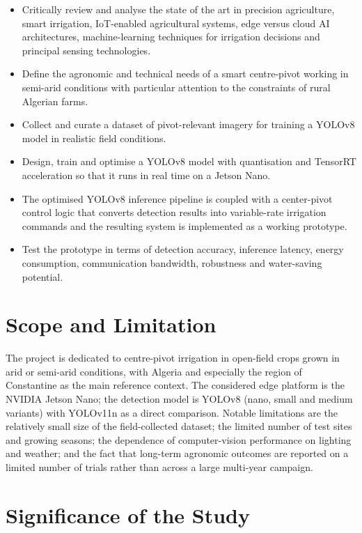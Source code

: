 \documentclass[12pt,a4paper]{report}
\begin{document}
\begin{itemize}
    \item Critically review and analyse the state of the art in precision agriculture, smart irrigation, IoT-enabled agricultural systems, edge versus cloud AI architectures, machine-learning techniques for irrigation decisions and principal sensing technologies.
    \item Define the agronomic and technical needs of a smart centre-pivot working in semi-arid conditions with particular attention to the constraints of rural Algerian farms.
    \item Collect and curate a dataset of pivot-relevant imagery for training a YOLOv8 model in realistic field conditions.
    \item Design, train and optimise a YOLOv8 model with quantisation and TensorRT acceleration so that it runs in real time on a Jetson Nano.
    \item The optimised YOLOv8 inference pipeline is coupled with a center-pivot control logic that converts detection results into variable-rate irrigation commands and the resulting system is implemented as a working prototype.
    \item Test the prototype in terms of detection accuracy, inference latency, energy consumption, communication bandwidth, robustness and water-saving potential.
\end{itemize}

\section{Scope and Limitation}

The project is dedicated to centre-pivot irrigation in open-field crops grown in arid or semi-arid conditions, with Algeria and especially the region of Constantine as the main reference context. The considered edge platform is the NVIDIA Jetson Nano; the detection model is YOLOv8 (nano, small and medium variants) with YOLOv11n as a direct comparison. Notable limitations are the relatively small size of the field-collected dataset; the limited number of test sites and growing seasons; the dependence of computer-vision performance on lighting and weather; and the fact that long-term agronomic outcomes are reported on a limited number of trials rather than across a large multi-year campaign.

\section{Significance of the Study}
\end{document}
